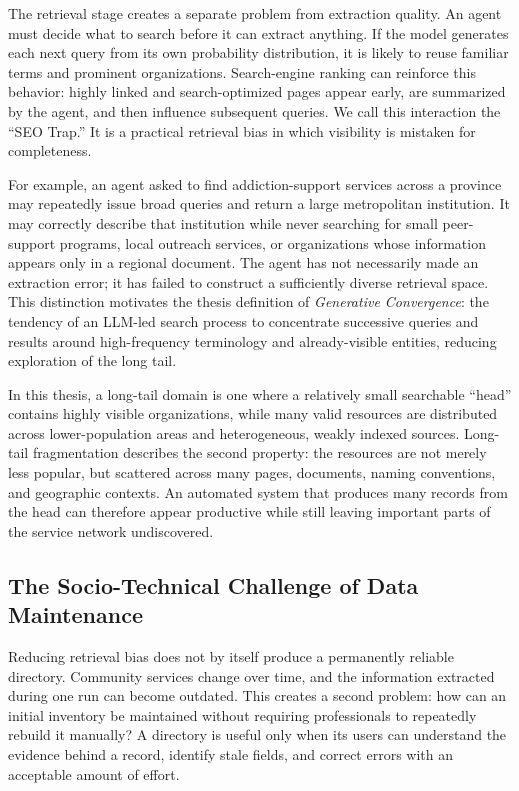 \documentclass[12pt,oneside]{report}
\begin{document}
The retrieval stage creates a separate problem from extraction quality. An agent must decide what to search before it can extract anything. If the model generates each next query from its own probability distribution, it is likely to reuse familiar terms and prominent organizations. Search-engine ranking can reinforce this behavior: highly linked and search-optimized pages appear early, are summarized by the agent, and then influence subsequent queries. We call this interaction the ``SEO Trap.'' It is a practical retrieval bias in which visibility is mistaken for completeness.

For example, an agent asked to find addiction-support services across a province may repeatedly issue broad queries and return a large metropolitan institution. It may correctly describe that institution while never searching for small peer-support programs, local outreach services, or organizations whose information appears only in a regional document. The agent has not necessarily made an extraction error; it has failed to construct a sufficiently diverse retrieval space. This distinction motivates the thesis definition of \textit{Generative Convergence}: the tendency of an LLM-led search process to concentrate successive queries and results around high-frequency terminology and already-visible entities, reducing exploration of the long tail.

In this thesis, a long-tail domain is one where a relatively small searchable ``head'' contains highly visible organizations, while many valid resources are distributed across lower-population areas and heterogeneous, weakly indexed sources. Long-tail fragmentation describes the second property: the resources are not merely less popular, but scattered across many pages, documents, naming conventions, and geographic contexts. An automated system that produces many records from the head can therefore appear productive while still leaving important parts of the service network undiscovered.

\subsection{The Socio-Technical Challenge of Data Maintenance}
Reducing retrieval bias does not by itself produce a permanently reliable directory. Community services change over time, and the information extracted during one run can become outdated. This creates a second problem: how can an initial inventory be maintained without requiring professionals to repeatedly rebuild it manually? A directory is useful only when its users can understand the evidence behind a record, identify stale fields, and correct errors with an acceptable amount of effort.
\end{document}
